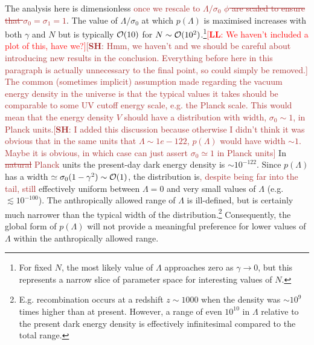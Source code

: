 \documentclass[12pt]{article}
\newcommand{\lfl}[1]{\textcolor{red}{[{\bf LL}: #1]}}
\newcommand{\SH}[1]{\textcolor{brown}{[{\bf SH}: #1]}}
\newcommand{\sh}[1]{\textcolor{brown}{#1}}
\begin{document}
The analysis here is dimensionless \sh{once we rescale to $\Lambda/\sigma_0$} \sh{\sout{$\phi$ are scaled to ensure that $\sigma_0 = \sigma_1 = 1$}}. The value of $\Lambda/\sigma_0$ at which $p(\Lambda)$ is maximised increases with both $\gamma$ and $N$ but is typically  ${\cal{O}}(10)$ for $N\sim{\cal{O}}(10^2)$.\footnote{For fixed $N$, the most likely value of $\Lambda$ approaches zero as $\gamma \rightarrow 0$, but this represents a narrow slice of parameter space for interesting values of $N$.}\lfl{We haven't included a plot of this, have we?}\SH{Hmm, we haven't and we should be careful about introducing new results in the conclusion. Everything before here in this paragraph is actually unnecessary to the final point, so could simply be removed.}
%
\sh{The common (sometimes implicit) assumption made regarding the vacuum energy density in the universe is that the typical values it takes should be comparable to some UV cutoff energy scale, e.g. the Planck scale. This would mean that the energy density $V$ should have a distribution with width, $\sigma_0 \sim 1$, in Planck units.}\SH{I added this discussion because otherwise I didn't think it was obvious that in the same units that $\Lambda \sim 1e-122$, $p(\Lambda)$ would have width $\sim 1$. Maybe it is obvious, in which case can just assert $\sigma_0 \simeq 1$ in Planck units} In \sh{\sout{natural} Planck} units the present-day dark energy density is $\sim 10^{-122}$. Since $p(\Lambda)$  has a width $\simeq \sigma_0 (1-\gamma^2)\sim{\cal{O}}(1)$, the distribution is\sh{, despite being far into the tail, still} effectively uniform between $\Lambda=0$ and very small values of $\Lambda$ (e.g. $\lesssim 10^{-100}$). The anthropically allowed range of $\Lambda$ is ill-defined, but is certainly much narrower than the typical width of the distribution.\footnote{E.g. recombination occurs at a redshift $z\sim 1000$ when the density was $\sim 10^9$ times higher than at present. However, a range of even $10^{10}$ in $\Lambda$ relative to the present dark energy density is effectively infinitesimal compared to the total range.} Consequently, the global form of $p(\Lambda)$ will  not provide a meaningful preference for lower values of $\Lambda$ within the anthropically allowed range. 
\end{document}
